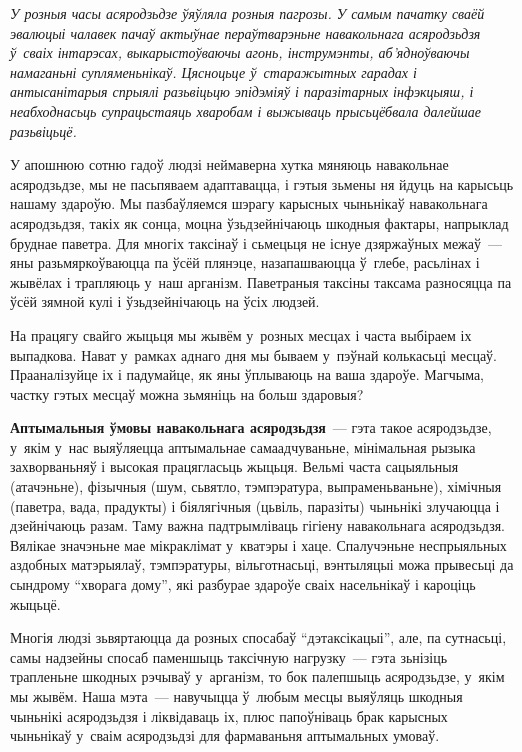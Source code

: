 \emph{У розныя часы асяродзьдзе ўяўляла розныя пагрозы. У самым пачатку сваёй эвалюцыі чалавек пачаў актыўнае пераўтварэньне навакольнага асяродзьдзя ў~сваіх інтарэсах, выкарыстоўваючы агонь, інструмэнты, аб'ядноўваючы намаганьні супляменьнікаў. Цясноцьце ў~старажытных гарадах і антысанітарыя спрыялі разьвіцьцю эпідэміяў і паразітарных інфэкцыяш, і неабходнасьць супрацьстаяць хваробам і выжываць прысьцёбвала далейшае разьвіцьцё.}

У апошнюю сотню гадоў людзі неймаверна хутка мяняюць навакольнае асяродзьдзе, мы не пасьпяваем адаптавацца, і гэтыя зьмены ня йдуць на карысьць нашаму здароўю. Мы пазбаўляемся шэрагу карысных чыньнікаў навакольнага асяродзьдзя, такіх як сонца, моцна ўзьдзейнічаюць шкодныя фактары, напрыклад бруднае паветра. Для многіх таксінаў і сьмецьця не існуе дзяржаўных межаў~--- яны разьмяркоўваюцца па ўсёй плянэце, назапашваюцца ў~глебе, расьлінах і жывёлах і трапляюць у~наш арганізм. Паветраныя таксіны таксама разносяцца па ўсёй зямной кулі і ўзьдзейнічаюць на ўсіх людзей.

На працягу свайго жыцьця мы жывём у~розных месцах і часта выбіраем іх выпадкова. Нават у~рамках аднаго дня мы бываем у~пэўнай колькасьці месцаў. Прааналізуйце іх і падумайце, як яны ўплываюць на ваша здароўе. Магчыма, частку гэтых месцаў можна зьмяніць на больш здаровыя?

\textbf{Аптымальныя ўмовы навакольнага асяродзьдзя}~--- гэта такое асяродзьдзе, у~якім у~нас выяўляецца аптымальнае самаадчуваньне, мінімальная рызыка захворваньняў і высокая працягласьць жыцьця. Вельмі часта сацыяльныя (атачэньне), фізычныя (шум, сьвятло, тэмпэратура, выпраменьваньне), хімічныя (паветра, вада, прадукты) і біялягічныя (цьвіль, паразіты) чыньнікі злучаюцца і дзейнічаюць разам. Таму важна падтрымліваць гігіену навакольнага асяродзьдзя. Вялікае значэньне мае мікраклімат у~кватэры і хаце. Спалучэньне неспрыяльных аздобных матэрыялаў, тэмпэратуры, вільготнасьці, вэнтыляцыі можа прывесьці да сындрому ``хворага дому'', які разбурае здароўе сваіх насельнікаў і кароціць жыцьцё.

Многія людзі зьвяртаюцца да розных спосабаў ``дэтаксікацыі'', але, па сутнасьці, самы надзейны спосаб паменшыць таксічную нагрузку~--- гэта зьнізіць трапленьне шкодных рэчываў у~арганізм, то бок палепшыць асяродзьдзе, у~якім мы жывём. Наша мэта~--- навучыцца ў~любым месцы выяўляць шкодныя чыньнікі асяродзьдзя і ліквідаваць іх, плюс папоўніваць брак карысных чыньнікаў у~сваім асяродзьдзі для фармаваньня аптымальных умоваў.

